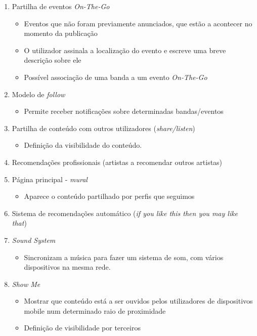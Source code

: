 \documentclass[12pt, a4paper, twoside]{report} %
\begin{document}
\begin{enumerate}
\clearpage
	
\item Partilha de eventos \textit{On-The-Go}
	\begin{itemize}
	\item Eventos que não foram previamente anunciados, que estão a acontecer no momento da publicação
	\item O utilizador assinala a localização do evento e escreve uma breve descrição sobre ele
    \item Possível associação de uma banda a um evento \textit{On-The-Go}
	\end{itemize}
	
\item Modelo de \textit{follow}
	\begin{itemize}
	\item Permite receber notificações sobre determinadas bandas/eventos
	\end{itemize}
	
\item Partilha de conteúdo com outros utilizadores (\textit{share/listen})
    \begin{itemize}
    \item Definição da visibilidade do conteúdo.
    \end{itemize}
    
\item Recomendações profissionais (artistas a recomendar outros artistas)

\item Página principal - \textit{mural}
    \begin{itemize}
    \item Aparece o conteúdo partilhado por perfis que seguimos
    \end{itemize}
    
\item Sistema de recomendações automático (\textit{if you like this then you may like that})

\item \textit{Sound System}
    \begin{itemize}
    \item Sincronizam a música para fazer um sistema de som, com vários dispositivos na mesma rede.
    \end{itemize}
    
\item \textit{Show Me}
	\begin{itemize}
	\item Mostrar que conteúdo está a ser ouvidos pelos utilizadores de dispositivos mobile num determinado raio de proximidade
    \item Definição de visibilidade por terceiros
	\end{itemize}
	

\end{enumerate}
\end{document}
